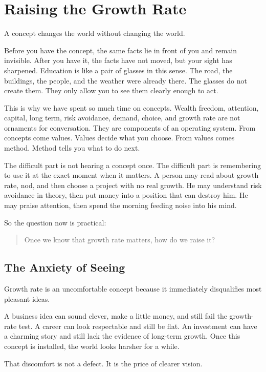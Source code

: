 \chapter{Raising the Growth Rate}

A concept changes the world without changing the world.

Before you have the concept, the same facts lie in front of you and remain invisible. After you have it, the facts have not moved, but your sight has sharpened. Education is like a pair of glasses in this sense. The road, the buildings, the people, and the weather were already there. The glasses do not create them. They only allow you to see them clearly enough to act.

This is why we have spent so much time on concepts. Wealth freedom, attention, capital, long term, risk avoidance, demand, choice, and growth rate are not ornaments for conversation. They are components of an operating system. From concepts come values. Values decide what you choose. From values comes method. Method tells you what to do next.

The difficult part is not hearing a concept once. The difficult part is remembering to use it at the exact moment when it matters. A person may read about growth rate, nod, and then choose a project with no real growth. He may understand risk avoidance in theory, then put money into a position that can destroy him. He may praise attention, then spend the morning feeding noise into his mind.

So the question now is practical:

\begin{quote}
Once we know that growth rate matters, how do we raise it?
\end{quote}

\section*{The Anxiety of Seeing}

Growth rate is an uncomfortable concept because it immediately disqualifies most pleasant ideas.

A business idea can sound clever, make a little money, and still fail the growth-rate test. A career can look respectable and still be flat. An investment can have a charming story and still lack the evidence of long-term growth. Once this concept is installed, the world looks harsher for a while.

That discomfort is not a defect. It is the price of clearer vision.

